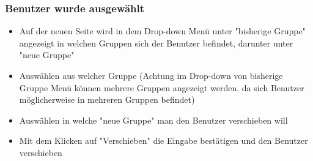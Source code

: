 \subsubsection*{Benutzer wurde ausgewählt}
\begin{itemize}
	\item Auf der neuen Seite wird in dem Drop-down Menü unter "bisherige Gruppe" angezeigt in welchen Gruppen sich der Benutzer befindet, darunter unter "neue Gruppe" 
	\item Auswählen aus welcher Gruppe (Achtung im Drop-down von bisherige Gruppe Menü können mehrere Gruppen angezeigt werden, da sich Benutzer möglicherweise in mehreren Gruppen befindet)
	\item Auswählen in welche "neue Gruppe" man den Benutzer verschieben will
	\item Mit dem Klicken auf "Verschieben" die Eingabe bestätigen und den Benutzer verschieben
\end{itemize}


\clearpage